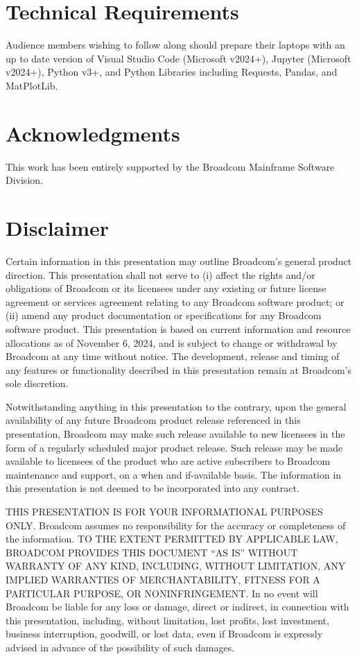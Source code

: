 \documentclass[a4paper]{article}
\begin{document}
\section{Technical Requirements}
    Audience members wishing to follow along should prepare their laptops with an up to date version of Visual Studio Code (Microsoft v2024+), Jupyter (Microsoft v2024+), Python v3+, and Python Libraries including Requests, Pandas, and MatPlotLib.


\section{Acknowledgments}
    This work has been entirely supported by the Broadcom Mainframe Software Division.

\section{Disclaimer}
    Certain information in this presentation may outline Broadcom’s general product direction.  This presentation shall not serve to (i) affect the rights and/or obligations of Broadcom or its licensees under any existing or future license agreement or services agreement relating to any Broadcom software product; or (ii) amend any product documentation or specifications for any Broadcom software product. This presentation is based on current information and resource allocations as of November 6, 2024, and is subject to change or withdrawal by Broadcom at any time without notice.  The development, release and timing of any features or functionality described in this presentation remain at Broadcom’s sole discretion.
    
    Notwithstanding anything in this presentation to the contrary, upon the general availability of any future Broadcom product release referenced in this presentation, Broadcom may make such release available to new licensees in the form of a regularly scheduled major product release. Such release may be made available to licensees of the product who are active subscribers to Broadcom maintenance and support, on a when and if-available basis. The information in this presentation is not deemed to be incorporated into any contract.
    
    THIS PRESENTATION IS FOR YOUR INFORMATIONAL PURPOSES ONLY. Broadcom assumes no responsibility for the accuracy or completeness of the information. TO THE EXTENT PERMITTED BY APPLICABLE LAW, BROADCOM PROVIDES THIS DOCUMENT “AS IS” WITHOUT WARRANTY OF ANY KIND, INCLUDING, WITHOUT LIMITATION, ANY IMPLIED WARRANTIES OF MERCHANTABILITY, FITNESS FOR A PARTICULAR PURPOSE, OR NONINFRINGEMENT.  In no event will Broadcom be liable for any loss or damage, direct or indirect, in connection with this presentation, including, without limitation, lost profits, lost investment, business interruption, goodwill, or lost data, even if Broadcom is expressly advised in advance of the possibility of such damages.
\end{document}
